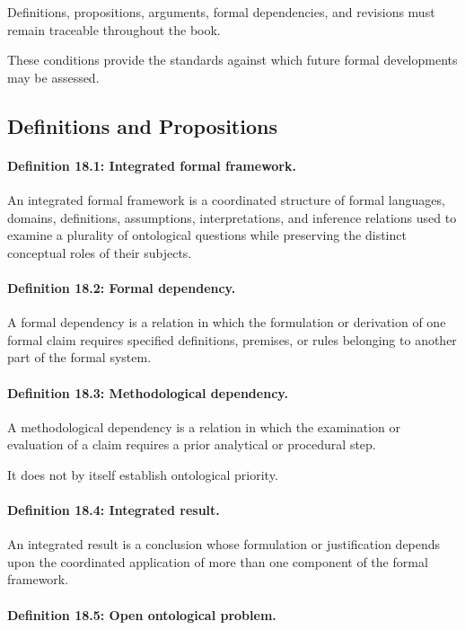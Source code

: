 Definitions, propositions,
arguments, formal
dependencies, and
revisions must
remain traceable
throughout the
book.

These conditions
provide the
standards against
which future
formal developments
may be assessed.

\subsection{Definitions and Propositions}

\paragraph{Definition 18.1: Integrated formal framework.}

An integrated
formal framework
is a coordinated
structure of
formal languages,
domains, definitions,
assumptions, interpretations,
and inference relations
used to examine
a plurality
of ontological
questions while
preserving the
distinct conceptual
roles of their
subjects.

\paragraph{Definition 18.2: Formal dependency.}

A formal
dependency is
a relation
in which
the formulation
or derivation
of one
formal claim
requires specified
definitions, premises,
or rules
belonging to
another part
of the
formal system.

\paragraph{Definition 18.3: Methodological dependency.}

A methodological
dependency is
a relation
in which
the examination
or evaluation
of a
claim requires
a prior
analytical or
procedural step.

It does
not by
itself establish
ontological priority.

\paragraph{Definition 18.4: Integrated result.}

An integrated
result is
a conclusion
whose formulation
or justification
depends upon
the coordinated
application of
more than
one component
of the
formal framework.

\paragraph{Definition 18.5: Open ontological problem.}

